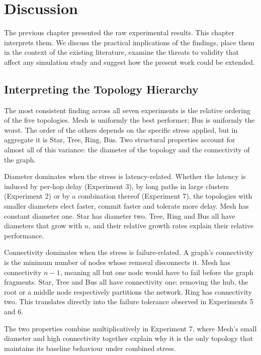 \chapter{Discussion}
\label{ch:discussion}

The previous chapter presented the raw experimental results. This chapter interprets them. We discuss the practical implications of the findings, place them in the context of the existing literature, examine the threats to validity that affect any simulation study and suggest how the present work could be extended.

\section{Interpreting the Topology Hierarchy}

The most consistent finding across all seven experiments is the relative ordering of the five topologies. Mesh is uniformly the best performer; Bus is uniformly the worst. The order of the others depends on the specific stress applied, but in aggregate it is Star, Tree, Ring, Bus. Two structural properties account for almost all of this variance: the diameter of the topology and the connectivity of the graph.

Diameter dominates when the stress is latency-related. Whether the latency is induced by per-hop delay (Experiment 3), by long paths in large clusters (Experiment 2) or by a combination thereof (Experiment 7), the topologies with smaller diameters elect faster, commit faster and tolerate more delay. Mesh has constant diameter one. Star has diameter two. Tree, Ring and Bus all have diameters that grow with $n$, and their relative growth rates explain their relative performance.

Connectivity dominates when the stress is failure-related. A graph's connectivity is the minimum number of nodes whose removal disconnects it. Mesh has connectivity $n-1$, meaning all but one node would have to fail before the graph fragments. Star, Tree and Bus all have connectivity one: removing the hub, the root or a middle node respectively partitions the network. Ring has connectivity two. This translates directly into the failure tolerance observed in Experiments 5 and 6.

The two properties combine multiplicatively in Experiment 7, where Mesh's small diameter and high connectivity together explain why it is the only topology that maintains its baseline behaviour under combined stress.

